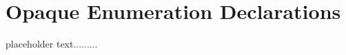 \newpage
\section[Opaque Enumeration Declarations]{Opaque Enumeration Declarations}\label{enumopaque}


placeholder text.........



